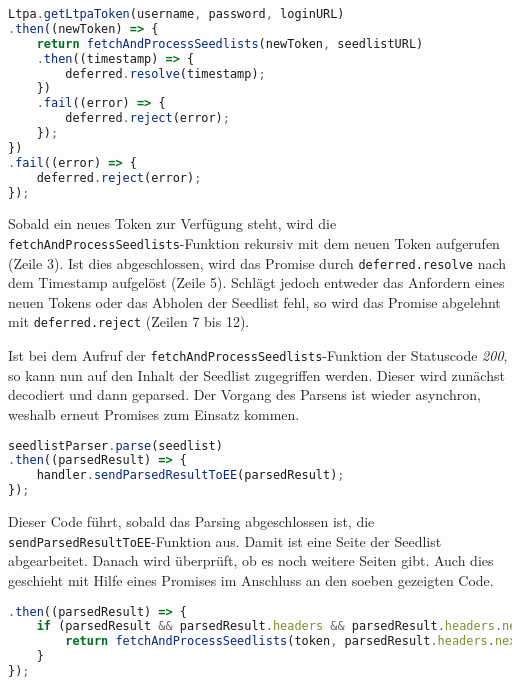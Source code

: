 \begin{lstlisting}[title=Anfordern eines Tokens mit anschließender Weiterverwendung, language=JavaScript]
Ltpa.getLtpaToken(username, password, loginURL)
.then((newToken) => {
	return fetchAndProcessSeedlists(newToken, seedlistURL)
	.then((timestamp) => {
		deferred.resolve(timestamp);
	})
	.fail((error) => {
		deferred.reject(error);
	});
})	
.fail((error) => {
	deferred.reject(error);
});
\end{lstlisting}

Sobald ein neues Token zur Verfügung steht, wird die \texttt{fetchAndProcessSeedlists}-Funktion rekursiv mit dem neuen Token aufgerufen (Zeile 3). Ist dies abgeschlossen, wird das Promise durch \texttt{deferred.resolve} nach dem Timestamp aufgelöst (Zeile 5). Schlägt jedoch entweder das Anfordern eines neuen Tokens oder das Abholen der Seedlist fehl, so wird das Promise abgelehnt mit \texttt{deferred.reject} (Zeilen 7 bis 12).

Ist bei dem Aufruf der \texttt{fetchAndProcessSeedlists}-Funktion der Statuscode \textit{200}, so kann nun auf den Inhalt der Seedlist zugegriffen werden. Dieser wird zunächst decodiert und dann geparsed. Der Vorgang des Parsens ist wieder asynchron, weshalb erneut Promises zum Einsatz kommen. \\

\begin{lstlisting}[title=Verwendung von Promises, language=JavaScript]
seedlistParser.parse(seedlist)
.then((parsedResult) => {
	handler.sendParsedResultToEE(parsedResult);
});
\end{lstlisting}

\begin{sloppypar}
Dieser Code führt, sobald das Parsing abgeschlossen ist, die \texttt{sendParsedResultToEE}-Funktion aus. Damit ist eine Seite der Seedlist abgearbeitet. Danach wird überprüft, ob es noch weitere Seiten gibt. Auch dies geschieht mit Hilfe eines Promises im Anschluss an den soeben gezeigten Code. \\
\end{sloppypar}

\begin{lstlisting}[title=Suche nach einer weiteren Seedlist-URL, language=JavaScript]
.then((parsedResult) => {
	if (parsedResult && parsedResult.headers && parsedResult.headers.nextPage) {
		return fetchAndProcessSeedlists(token, parsedResult.headers.nextPage)
	}
});
\end{lstlisting}

